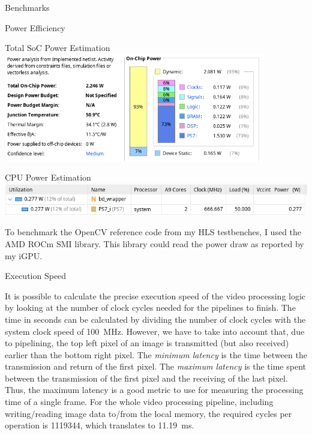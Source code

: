\documentclass{matthijs}
\begin{document}
\begin{hoofdstuk}{Benchmarks}
\begin{paragraaf}{Power Efficiency}
			\vspace{1.5ex}
			\begin{figuur}{Total SoC Power Estimation}
				\includegraphics[width=0.85\textwidth]{vivado-power.png}
			\end{figuur}
			\begin{figuur}{CPU Power Estimation}
				\includegraphics[width=\textwidth]{vivado-power-ps.png}
			\end{figuur}

			To benchmark the OpenCV reference code from my HLS testbenches, I used the AMD ROCm SMI library.
			This library could read the power draw as reported by my iGPU.

		\end{paragraaf}

		\begin{paragraaf}{Execution Speed}

			It is possible to calculate the precise execution speed of the video processing logic by looking at the number of clock cycles needed for the pipelines to finish.
			The time in seconds can be calculated by dividing the number of clock cycles with the system clock speed of \qty{100}{\mega\hertz}.
			However, we have to take into account that, due to pipelining, the top left pixel of an image is transmitted (but also received) earlier than the bottom right pixel.
			The \textit{minimum latency} is the time between the transmission and return of the first pixel.
			The \textit{maximum latency} is the time spent between the transmission of the first pixel and the receiving of the last pixel.
			Thus, the maximum latency is a good metric to use for measuring the processing time of a single frame.
			For the whole video processing pipeline, including writing/reading image data to/from the local memory, the required cycles per operation is 1119344, which translates to \qty{11.19}{\milli\second}.


\end{paragraaf}
\end{hoofdstuk}
\end{document}
